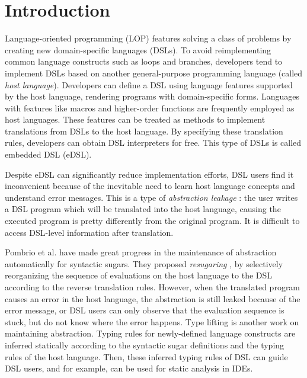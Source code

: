 \section{Introduction}

Language-oriented programming (LOP) \cite{LOP} features solving a class of problems by creating new domain-specific languages (DSLs).
To avoid reimplementing common language constructs such as loops and branches,
developers tend to implement DSLs based on another general-purpose programming language (called \textit{host language}).
Developers can define a DSL using language features supported by the host language, rendering programs with domain-specific forms.
Languages with features like macros and higher-order functions are frequently employed as host languages\cite{macro-dsl,macro-dsl-2}.
These features can be treated as methods to implement translations from DSLs to the host language.
By specifying these translation rules, developers can obtain DSL interpreters for free.
This type of DSLs is called embedded DSL (eDSL).

Despite eDSL can significantly reduce implementation efforts, DSL users find it inconvenient because of the inevitable need to learn host language concepts and understand error messages.
This is a type of \textit{abstraction leakage} \cite{Abstraction}:
 the user writes a DSL program which will be translated into the host language,
 causing the executed program is pretty differently from the original program.
It is difficult to access DSL-level information after translation.

Pombrio et al. have made great progress in the maintenance of abstraction automatically for syntactic sugars.
They proposed \textit{resugaring} \cite{resugar}, by selectively reorganizing the sequence of evaluations on the host language to the DSL according to the reverse translation rules.
However, when the translated program causes an error in the host language,
 the abstraction is still leaked because of the error message,
 or DSL users can only observe that the evaluation sequence is stuck, but do not know where the error happens.
Type lifting \cite{infer-types} is another work on maintaining abstraction.
Typing rules for newly-defined language constructs are inferred statically according to the syntactic sugar definitions and the typing rules of the host language.
Then, these inferred typing rules of DSL can guide DSL users, and for example, can be used for static analysis in IDEs.

